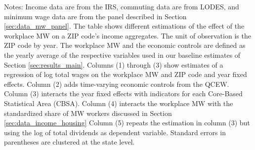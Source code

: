 \begin{table}[hbt!]
    \begin{minipage}{.95\textwidth} \footnotesize
        \vspace{2mm}
        Notes: 
        Income data are from the IRS, commuting data are from LODES, and minimum wage 
        data are from the panel described in Section \ref{sec:data_mw_panel}.
        The table shows different estimations of the effect of the workplace MW
        on a ZIP code's income aggregates.
        The unit of observation is the ZIP code by year.
        The workplace MW and the economic controls are defined as the yearly 
        average of the respective variables used in our baseline estimates of 
        Section \ref{sec:results_main}.
        Columns (1) through (3) show estimates of a regression of log total wages
        on the workplace MW and ZIP code and year fixed effects.
        Column (2) adds time-varying economic controls from the QCEW.
        Column (3) interacts the year fixed effects with indicators for each
        Core-Based Statistical Area (CBSA).
        Column (4) interacts the workplace MW with the standardized share of MW 
        workers discussed in Section \ref{sec:data_income_housing}
        Column (5) repeats the estimation in column (3) but using the log of 
        total dividends as dependent variable.
        Standard errors in parentheses are clustered at the state level.
    \end{minipage}
\end{table}

